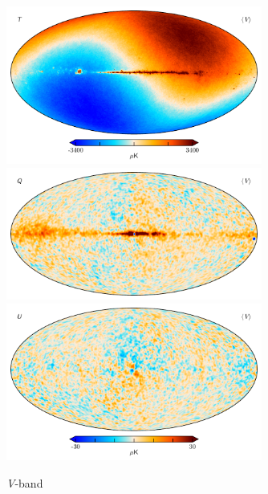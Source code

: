 \documentclass[twocolumn]{../../common/aa}
\newcommand{\V}[0]{\textit V}
\begin{document}
\begin{figure}
	\centering
	\includegraphics[width=0.75\textwidth]{figures/V_mu_I.pdf}
	\includegraphics[width=0.75\textwidth]{figures/V_mu_Q.pdf}
	\includegraphics[width=0.75\textwidth]{figures/V_mu_U.pdf}
	\caption{\V-band}
	\label{fig:vband}
\end{figure}
\end{document}
